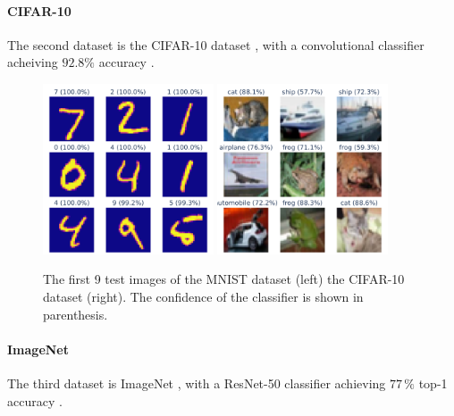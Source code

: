 \documentclass[]{scrarticle}
\begin{document}
\paragraph{CIFAR-10}
The second dataset is the CIFAR-10 dataset \cite{Krizhevsky2009LearningML},
with a convolutional classifier acheiving $92.8 \%$ accuracy \cite{999912022cifar10fastsimple}.

\begin{figure}[h]
  \centering
  \includegraphics[width=0.45\textwidth]{../images/sample_MNIST.png}
  \includegraphics[width=0.45\textwidth]{../images/sample_CIFAR10.png}
  \caption{
    The first 9 test images of
    the MNIST dataset (left)
    the CIFAR-10 dataset (right).
    The confidence of the classifier is shown in parenthesis.}
  \label{fig:mnist_cifar10_samples}
\end{figure}


\paragraph{ImageNet}
The third dataset is ImageNet \cite{Deng2009ImageNetAL}, with a ResNet-50 classifier
achieving $77\,\%$ top-1 accuracy \cite{He2015DeepRL}.
\end{document}
